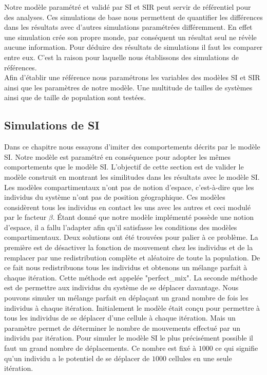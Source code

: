 Notre modèle paramétré et validé par SI et SIR peut servir de référentiel pour des analyses. Ces simulations de base nous permettent de quantifier les différences dans les résultats avec d'autres simulations paramétrées différemment. En effet une simulation crée son propre monde, par conséquent un résultat seul ne révèle aucune information. Pour déduire des résultats de simulations il faut les comparer entre eux. C'est la raison pour laquelle nous établissons des simulations de références.\\

Afin d'établir une référence nous paramétrons les variables des modèles SI et SIR ainsi que les paramètres de notre modèle. Une multitude de tailles de systèmes ainsi que de taille de population sont testées.\\

\subsection{Simulations de SI}

Dans ce chapitre nous essayons d'imiter des comportements décrits par le modèle SI. Notre modèle est paramétré en conséquence pour adopter les mêmes comportements que le modèle SI. L'objectif de cette section est de valider le modèle construit en montrant les similitudes dans les résultats avec le modèle SI. \\

Les modèles compartimentaux n'ont pas de notion d'espace, c'est-à-dire que les individus du système n'ont pas de position géographique. Ces modèles considèrent tous les individus en contact les uns avec les autres et ceci modulé par le facteur $\beta$. Étant donné que notre modèle implémenté possède une notion d'espace, il a fallu l'adapter afin qu'il satisfasse les conditions des modèles compartimentaux. Deux solutions ont été trouvées pour palier à ce problème. La première est de désactiver la fonction de mouvement chez les individus et de la remplacer par une redistribution complète et aléatoire de toute la population. De ce fait nous redistribuons tous les individus et obtenons un mélange parfait à chaque itération. Cette méthode est appelée "perfect\_mix". La seconde méthode est de permettre aux individus du système de se déplacer davantage. Nous pouvons simuler un mélange parfait en déplaçant un grand nombre de fois les individus à chaque itération. Initialement le modèle était conçu pour permettre à tous les individus de se déplacer d'une cellule à chaque itération. Mais un paramètre permet de déterminer le nombre de mouvements effectué par un individu par itération. Pour simuler le modèle SI le plus précisément possible il faut un grand nombre de déplacements. Ce nombre est fixé à $1000$ ce qui signifie qu'un individu a le potentiel de se déplacer de $1000$ cellules en une seule itération.\\

